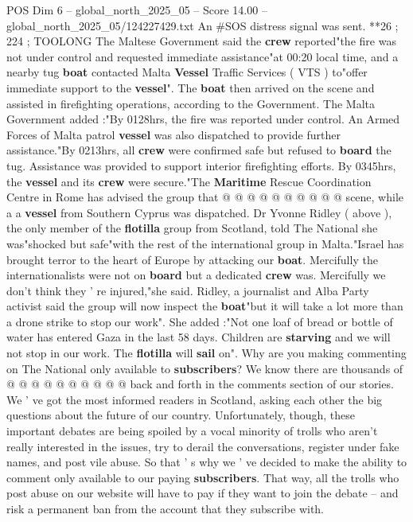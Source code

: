 \begin{textsample}{POS Dim 6 – global\_north\_2025\_05 – Score 14.00 – global\_north\_2025\_05/124227429.txt}
An \#SOS distress signal was sent. **26 ; 224 ; TOOLONG The Maltese Government said the \textbf{crew} reported"the fire was not under control and requested immediate assistance"at 00:20 local time, and a nearby tug \textbf{boat} contacted Malta \textbf{Vessel} Traffic Services ( VTS ) to"offer immediate support to the \textbf{vessel}".
The \textbf{boat} then arrived on the scene and assisted in firefighting operations, according to the Government.
The Malta Government added :"By 0128hrs, the fire was reported under control.
An Armed Forces of Malta patrol \textbf{vessel} was also dispatched to provide further assistance."By 0213hrs, all \textbf{crew} were confirmed safe but refused to \textbf{board} the tug.
Assistance was provided to support interior firefighting efforts.
By 0345hrs, the \textbf{vessel} and its \textbf{crew} were secure."The \textbf{Maritime} Rescue Coordination Centre in Rome has advised the group that @ @ @ @ @ @ @ @ @ @ scene, while a a \textbf{vessel} from Southern Cyprus was dispatched.
Dr Yvonne Ridley ( above ), the only member of the \textbf{flotilla} group from Scotland, told The National she was"shocked but safe"with the rest of the international group in Malta."Israel has brought terror to the heart of Europe by attacking our \textbf{boat}.
Mercifully the internationalists were not on \textbf{board} but a dedicated \textbf{crew} was.
Mercifully we don't think they ' re injured,"she said.
Ridley, a journalist and Alba Party activist said the group will now inspect the \textbf{boat}"but it will take a lot more than a drone strike to stop our work".
She added :"Not one loaf of bread or bottle of water has entered Gaza in the last 58 days.
Children are \textbf{starving} and we will not stop in our work.
The \textbf{flotilla} will \textbf{sail} on".
Why are you making commenting on The National only available to \textbf{subscribers}?
We know there are thousands of @ @ @ @ @ @ @ @ @ @ back and forth in the comments section of our stories.
We ' ve got the most informed readers in Scotland, asking each other the big questions about the future of our country.
Unfortunately, though, these important debates are being spoiled by a vocal minority of trolls who aren't really interested in the issues, try to derail the conversations, register under fake names, and post vile abuse.
So that ' s why we ' ve decided to make the ability to comment only available to our paying \textbf{subscribers}.
That way, all the trolls who post abuse on our website will have to pay if they want to join the debate -- and risk a permanent ban from the account that they subscribe with.

\end{textsample}
